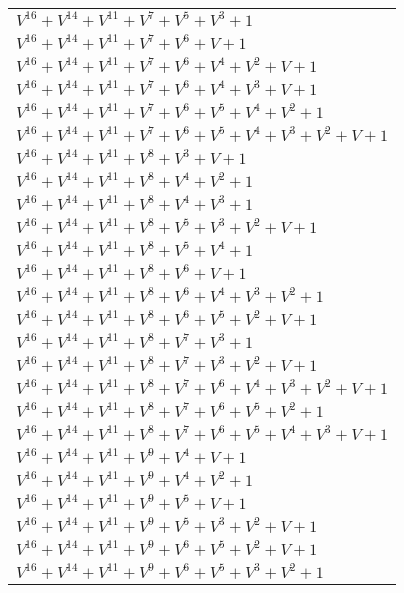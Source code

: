\documentclass[12pt]{article}
\begin{document}
\begin{adjustwidth}{-4cm}{}
\begin{center}
\begin{longtable}{|l|}
$V^{16}  +V^{14}  +V^{11}  +V^{7}  +V^{5}  +V^{3}  + 1$ \\
$V^{16}  +V^{14}  +V^{11}  +V^{7}  +V^{6}  + V + 1$ \\
$V^{16}  +V^{14}  +V^{11}  +V^{7}  +V^{6}  +V^{4}  +V^{2}  + V + 1$ \\
$V^{16}  +V^{14}  +V^{11}  +V^{7}  +V^{6}  +V^{4}  +V^{3}  + V + 1$ \\
$V^{16}  +V^{14}  +V^{11}  +V^{7}  +V^{6}  +V^{5}  +V^{4}  +V^{2}  + 1$ \\
$V^{16}  +V^{14}  +V^{11}  +V^{7}  +V^{6}  +V^{5}  +V^{4}  +V^{3}  +V^{2}  + V + 1$ \\
$V^{16}  +V^{14}  +V^{11}  +V^{8}  +V^{3}  + V + 1$ \\
$V^{16}  +V^{14}  +V^{11}  +V^{8}  +V^{4}  +V^{2}  + 1$ \\
$V^{16}  +V^{14}  +V^{11}  +V^{8}  +V^{4}  +V^{3}  + 1$ \\
$V^{16}  +V^{14}  +V^{11}  +V^{8}  +V^{5}  +V^{3}  +V^{2}  + V + 1$ \\
$V^{16}  +V^{14}  +V^{11}  +V^{8}  +V^{5}  +V^{4}  + 1$ \\
$V^{16}  +V^{14}  +V^{11}  +V^{8}  +V^{6}  + V + 1$ \\
$V^{16}  +V^{14}  +V^{11}  +V^{8}  +V^{6}  +V^{4}  +V^{3}  +V^{2}  + 1$ \\
$V^{16}  +V^{14}  +V^{11}  +V^{8}  +V^{6}  +V^{5}  +V^{2}  + V + 1$ \\
$V^{16}  +V^{14}  +V^{11}  +V^{8}  +V^{7}  +V^{3}  + 1$ \\
$V^{16}  +V^{14}  +V^{11}  +V^{8}  +V^{7}  +V^{3}  +V^{2}  + V + 1$ \\
$V^{16}  +V^{14}  +V^{11}  +V^{8}  +V^{7}  +V^{6}  +V^{4}  +V^{3}  +V^{2}  + V + 1$ \\
$V^{16}  +V^{14}  +V^{11}  +V^{8}  +V^{7}  +V^{6}  +V^{5}  +V^{2}  + 1$ \\
$V^{16}  +V^{14}  +V^{11}  +V^{8}  +V^{7}  +V^{6}  +V^{5}  +V^{4}  +V^{3}  + V + 1$ \\
$V^{16}  +V^{14}  +V^{11}  +V^{9}  +V^{4}  + V + 1$ \\
$V^{16}  +V^{14}  +V^{11}  +V^{9}  +V^{4}  +V^{2}  + 1$ \\
$V^{16}  +V^{14}  +V^{11}  +V^{9}  +V^{5}  + V + 1$ \\
$V^{16}  +V^{14}  +V^{11}  +V^{9}  +V^{5}  +V^{3}  +V^{2}  + V + 1$ \\
$V^{16}  +V^{14}  +V^{11}  +V^{9}  +V^{6}  +V^{5}  +V^{2}  + V + 1$ \\
$V^{16}  +V^{14}  +V^{11}  +V^{9}  +V^{6}  +V^{5}  +V^{3}  +V^{2}  + 1$ \\

\end{longtable}
\end{center}
\end{adjustwidth}
\end{document}
